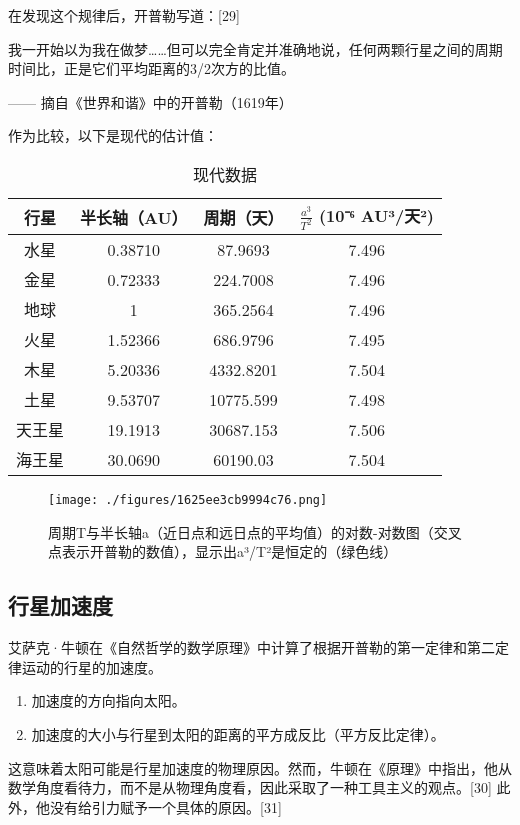 在发现这个规律后，开普勒写道：[29]

我一开始以为我在做梦……但可以完全肯定并准确地说，任何两颗行星之间的周期时间比，正是它们平均距离的3/2次方的比值。

—— 摘自《世界和谐》中的开普勒（1619年）

作为比较，以下是现代的估计值：
\begin{table}[ht]
\centering
\caption{现代数据}\label{KPL1}
\begin{tabular}{|c|c|c|c|}
\hline \textbf{行星} & \textbf{半长轴（AU）} & \textbf{周期（天）} &\textbf{ \({\frac {a^{3}}{T^{2}}}\) (10⁻⁶ AU³/天²)  }\\
\hline 水星 & 0.38710 & 87.9693 & 7.496 \\  
\hline 金星 & 0.72333 & 224.7008 & 7.496 \\ 
\hline 地球 & 1 & 365.2564 & 7.496 \\ 
\hline 火星 & 1.52366 & 686.9796 & 7.495 \\ 
\hline 木星 & 5.20336 & 4332.8201 & 7.504 \\
\hline 土星 & 9.53707 & 10775.599 & 7.498 \\ 
\hline 天王星 & 19.1913 & 30687.153 & 7.506 \\ 
\hline 海王星 & 30.0690 & 60190.03 & 7.504 \\
\hline 
\end{tabular}
\end{table}
\begin{figure}[ht]
\centering
\texttt{[image: ./figures/1625ee3cb9994c76.png]}
\caption{周期T与半长轴a（近日点和远日点的平均值）的对数-对数图（交叉点表示开普勒的数值），显示出a³/T²是恒定的（绿色线）} \label{fig_KPL_6}
\end{figure}
\subsection{行星加速度}  
艾萨克·牛顿在《自然哲学的数学原理》中计算了根据开普勒的第一定律和第二定律运动的行星的加速度。
\begin{enumerate}
\item 加速度的方向指向太阳。  
\item 加速度的大小与行星到太阳的距离的平方成反比（平方反比定律）。
\end{enumerate}
这意味着太阳可能是行星加速度的物理原因。然而，牛顿在《原理》中指出，他从数学角度看待力，而不是从物理角度看，因此采取了一种工具主义的观点。[30] 此外，他没有给引力赋予一个具体的原因。[31]

